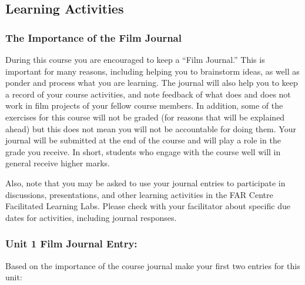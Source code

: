 \documentclass[
]{book}
\begin{document}
\hypertarget{learning-activities}{%
\subsection*{Learning Activities}\label{learning-activities}}

\begin{reflect}
\hypertarget{the-importance-of-the-film-journal}{%
\subsubsection*{The Importance of the Film Journal}\label{the-importance-of-the-film-journal}}

During this course you are encouraged to keep a ``Film Journal.'' This is important for many reasons, including helping you to brainstorm ideas, as well as ponder and process what you are learning. The journal will also help you to keep a record of your course activities, and note feedback of what does and does not work in film projects of your fellow course members. In addition, some of the exercises for this course will not be graded (for reasons that will be explained ahead) but this does not mean you will not be accountable for doing them. Your journal will be submitted at the end of the course and will play a role in the grade you receive. In short, students who engage with the course well will in general receive higher marks.

Also, note that you may be asked to use your journal entries to participate in discussions, presentations, and other learning activities in the FAR Centre Facilitated Learning Labs. Please check with your facilitator about specific due dates for activities, including journal responses.

\hypertarget{unit-1-film-journal-entry}{%
\subsubsection*{Unit 1 Film Journal Entry:}\label{unit-1-film-journal-entry}}

Based on the importance of the course journal make your first two entries for this unit:


\end{reflect}
\end{document}
